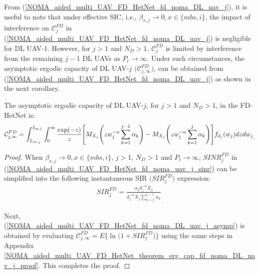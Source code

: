 From (\ref{NOMA_aided_multi_UAV_FD_HetNet_fd_noma_DL_uav_j}), it is useful to note that under effective SIC, i.e., $\beta_{x,j} \to 0, x \in \{mbs, i\}$, the impact of interference on $\mathcal{C}_{j}^{FD}$ in (\ref{NOMA_aided_multi_UAV_FD_HetNet_fd_noma_DL_uav_j}) is negligible for DL UAV-1. However, for $j>1$ and $N_D > 1$, $\mathcal{C}_{j}^{FD}$ is limited by interference from the remaining $j-1$ DL UAVs as $P_t  \to \infty$. Under such circumstances, the asymptotic ergodic capacity of DL UAV-$j$ $\big(\mathcal{C}_{j,\infty}^{FD}\big)$, can be obtained from (\ref{NOMA_aided_multi_UAV_FD_HetNet_fd_noma_DL_uav_j}) as shown in the next corollary.
\begin{corollary} \label{NOMA_aided_multi_UAV_FD_HetNet_corollary_erg_cap_fd_noma_DL_uav_j}
The asymptotic ergodic capacity of DL UAV-$j$, for $j > 1$ and $N_D > 1$, in the FD-HetNet is:
\begin{eqnarray} \label{NOMA_aided_multi_UAV_FD_HetNet_fd_noma_DL_uav_j_asymp}
\mathcal{C}_{j,\infty}^{FD} \hspace{-0.0cm} = \hspace{-0.0cm} \int_{L_{m,j}}^{L_{p,j}} \int_{0}^{\infty} \frac{\exp(-z)}{z} \Bigg[M_{X_j}\Bigg(z w_j^{-n} \sum_{k=1}^{j-1}\alpha_k \Bigg) - M_{X_j}\Bigg(z w_j^{-n} \sum_{k=1}^{j}\alpha_k\Bigg)\Bigg]  f_{d_{j}}(w_j) dz {dw_j}_,
\end{eqnarray}
\end{corollary}
\begin{proof}
When $\beta_{x,j} \to 0, x \in \{mbs, i\}$, $j>1$, $N_D > 1$ and $P_t  \to \infty$, $SINR_{j}^{FD}$ in (\ref{NOMA_aided_multi_UAV_FD_HetNet_fd_noma_uav_j_sinr}) can be simplified into the following instantaneous SIR $\big(SIR_{j}^{FD}\big)$ expression:
\begin{eqnarray} \label{NOMA_aided_multi_UAV_FD_HetNet_fd_noma_uav_j_sir}
 SIR_j^{FD} =\frac{\alpha_j d_j^{-n} X_j}{d_j^{-n} X_j \sum_{k=1}^{j-1}\alpha_k}_.
\end{eqnarray}

Next, (\ref{NOMA_aided_multi_UAV_FD_HetNet_fd_noma_DL_uav_j_asymp}) is obtained by evaluating $\mathcal{C}_{j,\infty}^{FD} = E\Big\{\ln\Big(1+SIR_{j}^{FD}\Big)\Big\}$ using the same steps in Appendix \ref{NOMA_aided_multi_UAV_FD_HetNet_theorem_erg_cap_fd_noma_DL_uav_j_proof}. This completes the proof.
\end{proof}

